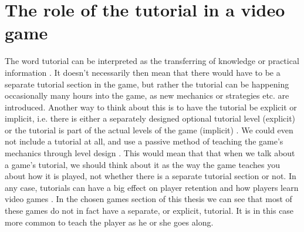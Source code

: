 \section{The role of the tutorial in a video game}

The word tutorial can be interpreted as the transferring of knowledge or practical information \cite{tutorial}. It doesn't necessarily then mean that there would have to be a separate tutorial section in the game, but rather the tutorial can be happening occasionally many hours into the game, as new mechanics or strategies etc. are introduced. Another way to think about this is to have the tutorial be explicit or implicit, i.e. there is either a separately designed optional tutorial level (explicit) or the tutorial is part of the actual levels of the game (implicit) \cite{Adams2013}. We could even not include a tutorial at all, and use a passive method of teaching the game's mechanics through level design \cite{Moss2017}. This would mean that that when we talk about a game's tutorial, we should think about it as the way the game teaches you about how it is played, not whether there is a separate tutorial section or not. In any case, tutorials can have a big effect on player retention and how players learn video games \cite{Andersen2012}. In the chosen games section of this thesis we can see that most of these games do not in fact have a separate, or explicit, tutorial. It is in this case more common to teach the player as he or she goes along. 
